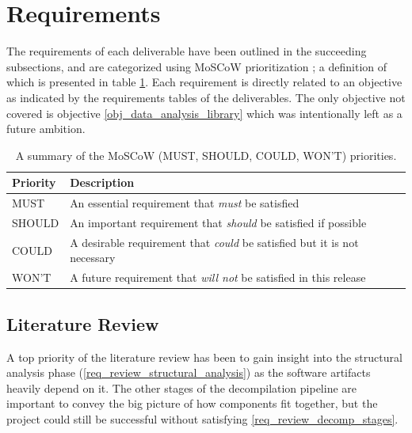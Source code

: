 \documentclass[12pt, a4paper]{article}
\begin{document}

\section{Requirements}

The requirements of each deliverable have been outlined in the succeeding subsections, and are categorized using MoSCoW prioritization \cite{MoSCoW_analysis}; a definition of which is presented in table \ref{MoSCoW_priorities}. Each requirement is directly related to an objective as indicated by the requirements tables of the deliverables. The only objective not covered is objective \ref{obj_data_analysis_library} which was intentionally left as a future ambition.

\begin{table}[htbp]
	\begin{center}
		\begin{tabular}{|l|l|}
			\hline
			Priority & Description \\
			\hline
			MUST & An essential requirement that \textit{must} be satisfied \\
			SHOULD & An important requirement that \textit{should} be satisfied if possible \\
			COULD & A desirable requirement that \textit{could} be satisfied but it is not necessary \\
			WON'T & A future requirement that \textit{will not} be satisfied in this release \\
			\hline
		\end{tabular}
	\end{center}
	\caption{A summary of the MoSCoW (MUST, SHOULD, COULD, WON'T) priorities.}
	\label{MoSCoW_priorities}
\end{table}


\subsection{Literature Review}

A top priority of the literature review has been to gain insight into the structural analysis phase (\ref{req_review_structural_analysis}) as the software artifacts heavily depend on it. The other stages of the decompilation pipeline are important to convey the big picture of how components fit together, but the project could still be successful without satisfying \ref{req_review_decomp_stages}.
\end{document}
